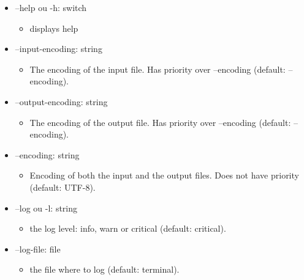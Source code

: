 \documentclass[manual-fr.tex]{subfiles}
\begin{document}
\begin{itemize}
\begin{itemize}
            \item[] --help ou -h: switch
                \begin{itemize}
                    \item[] displays help
                \end{itemize}
            \item[] --input-encoding: string
                \begin{itemize}
                    \item[] The encoding of the input file. Has priority over --encoding (default: --encoding).
                \end{itemize}
            \item[] --output-encoding: string
                \begin{itemize}
                    \item[] The encoding of the output file. Has priority over --encoding (default: --encoding).
                \end{itemize}
            \item[] --encoding: string
                \begin{itemize}
                    \item[] Encoding of both the input and the output files. Does not have priority (default: UTF-8).
                \end{itemize}
            \item[] --log ou -l: string
                \begin{itemize}
                    \item[] the log level: info, warn or critical (default: critical).
                \end{itemize}
            \item[] --log-file: file
                \begin{itemize}
                    \item[] the file where to log (default: terminal).
                \end{itemize}
        \end{itemize}
\end{itemize}
\end{document}
